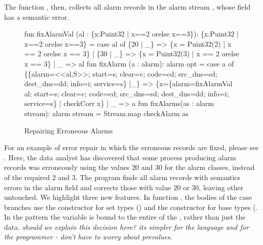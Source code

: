 \documentclass{entcs}
\begin{document}
The function , then,
collects all alarm records in the alarm stream , whose
 field has a semantic error.

\begin{figure}
  \centering
\begin{code}
fun fixAlarmVal (al : \{x:Puint32 | x==2 orelse x==3\}): 
  \{x:Puint32 | x==2 orelse x==3\} =
    case al of
      \{20 | _\} => \{x = Puint32(2) | x == 2 orelse x == 3\}
    | \{30 | _\} => \{x = Puint32(3) | x == 2 orelse x == 3\}
    | _ => al
\mbox{}
fun fixAlarm (a : alarm): alarm opt =
    case a of 
	\{\{alarm=<<al,S>>; start=s; clear=c; 
          code=cd; src_dns=sd; dest_dns=dd; 
	  info=i; service=s\} |_\} 
          => \{x=\{alarm=fixAlarmVal al; 
                 start=s; clear=c; 
                 code=cd; src_dns=sd; dest_dns=dd; 
                 info=i; service=s\}
              | checkCorr x\} 
      | _ => a
\mbox{}
fun fixAlarms(as : alarm stream): alarm stream =
    Stream.map checkAlarm as
\end{code}
  \caption{Repairing Erroneous Alarms}
  \label{fig:ex-error-repair}
\end{figure}

For an example of error repair in which the erroneous records are
fixed, please see . Here, the data analyst
has discovered that some process producing alarm records was
erroneously using the values $20$ and $30$ for the alarm classes,
instead of the required $2$ and $3$. The program finds all alarm
records with semantics errors in the alarm field and corrects those
with value $20$ or $30$, leaving other untouched. We highlight three
new features. In function , the bodies of the case
branches use the constructor for set types () and the
constructor for base types (.  In the pattern
 the variable  is bound to the entire \pvalue{} of
the  \pvalue{}, rather than just the data. {\em should we
  explain this decision here?  its simpler for the language and for
  the programmer - don't have to worry about prevalues.}
\end{document}
